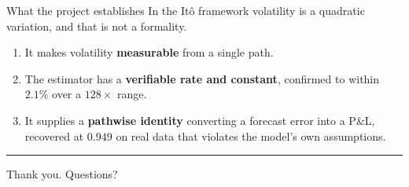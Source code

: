 \documentclass[aspectratio=169,11pt]{beamer}
\begin{document}
\begin{frame}{What the project establishes}
In the It\^o framework volatility is a quadratic variation, and that is not a formality.
\vspace{0.7em}
\begin{enumerate}\itemsep4pt
  \item It makes volatility \textbf{measurable} from a single path.
  \item The estimator has a \textbf{verifiable rate and constant}, confirmed to within $2.1\%$
        over a $128\times$ range.
  \item It supplies a \textbf{pathwise identity} converting a forecast error into a P\&L,
        recovered at $0.949$ on real data that violates the model's own assumptions.
\end{enumerate}
\vfill
{\color{accent}\rule{2.0em}{1.4pt}}\par\vspace{0.3em}
{\sffamily\large\color{ink}Thank you. Questions?}
\end{frame}
\end{document}
